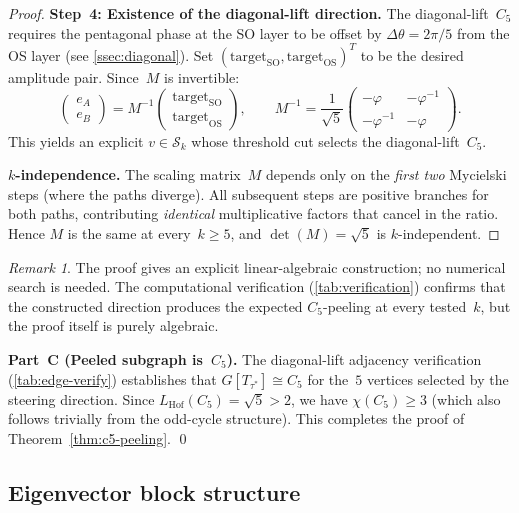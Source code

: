 \documentclass[11pt,a4paper]{amsart}
\theoremstyle{plain}
\theoremstyle{definition}
\theoremstyle{remark}
\newtheorem{remark}[theorem]{Remark}
\newcommand{\vp}{\varphi}
\newcommand{\chr}{\chi}
\newcommand{\LHof}{L_{\mathrm{Hof}}}
\begin{document}
\begin{proof}
\medskip
\noindent\textbf{Step~4: Existence of the diagonal-lift direction.}
The diagonal-lift~$C_5$ requires the pentagonal phase at the SO layer to be
offset by $\Delta\theta = 2\pi/5$ from the OS layer (see
\cref{ssec:diagonal}).  Set
$(\text{target}_{\mathrm{SO}}, \text{target}_{\mathrm{OS}})^T$ to be the
desired amplitude pair.  Since~$M$ is invertible:
\[
  \begin{pmatrix} e_A \\ e_B \end{pmatrix}
  = M^{-1} \begin{pmatrix} \text{target}_{\mathrm{SO}} \\
  \text{target}_{\mathrm{OS}} \end{pmatrix},
  \qquad
  M^{-1} = \frac{1}{\sqrt{5}}
  \begin{pmatrix} -\vp & -\vp^{-1} \\ -\vp^{-1} & -\vp \end{pmatrix}.
\]
This yields an explicit $v \in \mathcal{S}_k$ whose threshold cut selects the
diagonal-lift~$C_5$.

\medskip
\noindent\textbf{$k$-independence.}
The scaling matrix~$M$ depends only on the \emph{first two} Mycielski steps
(where the paths diverge).  All subsequent steps are positive branches for
both paths, contributing \emph{identical} multiplicative factors that cancel
in the ratio.  Hence $M$ is the same at every~$k \geq 5$, and
$\det(M) = \sqrt{5}$ is $k$-independent.
\end{proof}

\begin{remark}
The proof gives an explicit linear-algebraic construction; no numerical search
is needed.  The computational verification (\cref{tab:verification}) confirms
that the constructed direction produces the expected $C_5$-peeling at every
tested~$k$, but the proof itself is purely algebraic.
\end{remark}

\medskip\noindent
\textbf{Part~C (Peeled subgraph is~$C_5$).}
The diagonal-lift adjacency verification (\cref{tab:edge-verify}) establishes
that $G[T_{\tau^*}] \cong C_5$ for the~$5$ vertices selected by the steering
direction.  Since $\LHof(C_5) = \sqrt{5} > 2$, we have $\chr(C_5) \geq 3$
(which also follows trivially from the odd-cycle structure).  This completes
the proof of Theorem~\ref{thm:c5-peeling}. \qed

\subsection{Eigenvector block structure}
\end{document}
